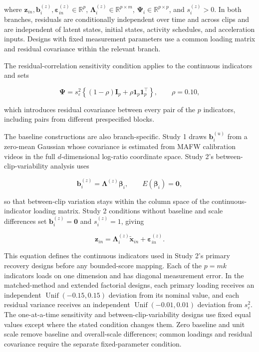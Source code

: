 \documentclass[
]{article}
\begin{document}
where
\(\mathbf z_{in},\mathbf b_i^{(z)},\boldsymbol\varepsilon_{in}^{(z)}\in\mathbb R^p\),
\(\boldsymbol\Lambda_i^{(z)}\in\mathbb R^{p\times m}\),
\(\boldsymbol\Psi_i\in\mathbb R^{p\times p}\), and \(s_i^{(z)}>0\). In
both branches, residuals are conditionally independent over time and
across clips and are independent of latent states, initial states,
activity schedules, and acceleration inputs. Designs with fixed
measurement parameters use a common loading matrix and residual
covariance within the relevant branch.

The residual-correlation sensitivity condition applies to the continuous
indicators and sets

\[
\boldsymbol\Psi
=s_\varepsilon^2
\left\{(1-\rho)\mathbf I_p
+\rho\mathbf 1_p\mathbf 1_p^\top\right\},
\qquad \rho=0.10,
\]

which introduces residual covariance between every pair of the \(p\)
indicators, including pairs from different prespecified blocks.

The baseline constructions are also branch-specific. Study 1 draws
\(\mathbf b_i^{(u)}\) from a zero-mean Gaussian whose covariance is
estimated from MAFW calibration videos in the full \(d\)-dimensional
log-ratio coordinate space. Study 2's between-clip-variability analysis
uses

\[
\mathbf b_i^{(z)}
=\boldsymbol\Lambda^{(z)}\boldsymbol\beta_i,
\qquad E(\boldsymbol\beta_i)=\mathbf 0,
\]

so that between-clip variation stays within the column space of the
continuous-indicator loading matrix. Study 2 conditions without baseline
and scale differences set \(\mathbf b_i^{(z)}=\mathbf 0\) and
\(s_i^{(z)}=1\), giving

\[
\mathbf z_{in}
=\boldsymbol\Lambda_i^{(z)}\tilde{\mathbf x}_{in}
+\boldsymbol\varepsilon_{in}^{(z)}.
\]

This equation defines the continuous indicators used in Study 2's
primary recovery designs before any bounded-score mapping. Each of the
\(p=mk\) indicators loads on one dimension and has diagonal measurement
error. In the matched-method and extended factorial designs, each
primary loading receives an independent
\(\operatorname{Unif}(-0.15,0.15)\) deviation from its nominal value,
and each residual variance receives an independent
\(\operatorname{Unif}(-0.01,0.01)\) deviation from \(s_\varepsilon^2\).
The one-at-a-time sensitivity and between-clip-variability designs use
fixed equal values except where the stated condition changes them. Zero
baseline and unit scale remove baseline and overall-scale differences;
common loadings and residual covariance require the separate
fixed-parameter condition.
\end{document}
